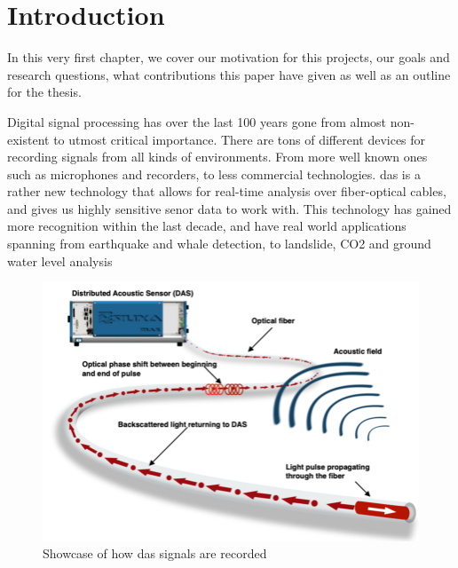 \chapter{Introduction}
\label{chap:introduction}

In this very first chapter, we cover our motivation for this projects, our goals and research questions, what contributions this paper have given as well as an outline for the thesis.


Digital signal processing has over the last 100 years gone from almost non-existent to utmost critical importance. There are tons of different devices for recording signals from all kinds of environments. From more well known ones such as microphones and recorders, to less commercial technologies. \acrfull{das} is a rather new technology that allows for real-time analysis over fiber-optical cables, and gives us highly sensitive senor data to work with. This technology has gained more recognition within the last decade, and have real world applications spanning from earthquake and whale detection, to landslide, CO2 and ground water level analysis \\

\begin{figure}[!h]
    \centering
    \includegraphics[width=0.7\linewidth]{figures/das.png}
    \caption{Showcase of how \acrshort{das} signals are recorded}
    \label{fig:das-fig}
\end{figure}








